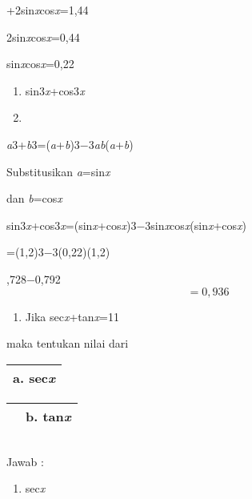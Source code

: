 \documentclass[11pt,fleqn]{book} %
\begin{document}
+2sin\textit{x}cos\textit{x}=1,44

\noindent 2sin\textit{x}cos\textit{x}=0,44

\noindent sin\textit{x}cos\textit{x}=0,22

\noindent 

\begin{enumerate}
\item  sin3\textit{x}+cos3\textit{x}

\item  
\end{enumerate}

\noindent \textit{a}3+\textit{b}3=(\textit{a}+\textit{b})3$\mathrm{-}$3\textit{ab}(\textit{a}+\textit{b})

\noindent Substitusikan \textit{a}=sin\textit{x}

\noindent dan \textit{b}=cos\textit{x}

\noindent sin3\textit{x}+cos3\textit{x}=(sin\textit{x}+cos\textit{x})3$\mathrm{-}$3sin\textit{x}cos\textit{x}(sin\textit{x}+cos\textit{x})

\noindent =(1,2)3$\mathrm{-}$3(0,22)(1,2)

,728$\mathrm{-}$0,792
\[=0,936\] 

\begin{enumerate}
\item  Jika sec\textit{x}+tan\textit{x}=11
\end{enumerate}

\noindent maka tentukan nilai dari 

\begin{tabular}{|p{0.3in}|} \hline 
a. sec\textit{x} \\ \hline 
\end{tabular}



\begin{tabular}{|p{0.0in}|p{0.3in}|} \hline 
 & b. tan\textit{x} \\ \hline 
\end{tabular}



\begin{tabular}{|p{0.0in}|} \hline 
 \\ \hline 
\end{tabular}

Jawab : 

\begin{enumerate}
\item  sec\textit{x}
\end{enumerate}
\end{document}

